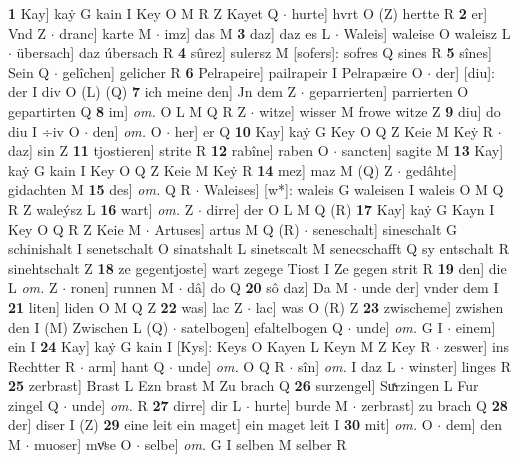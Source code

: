 \documentclass[8pt,a4paper,notitlepage]{article}
\begin{document}
\begin{table}[ht]
\begin{minipage}[t]{0.5\linewidth}
\textbf{1} Kay] kaẏ G kain I Key O M R Z Kayet Q  $\cdot$ hurte] hvrt O (Z) hertte R \textbf{2} er] Vnd Z  $\cdot$ dranc] karte M  $\cdot$ imz] das M \textbf{3} daz] daz es L  $\cdot$ Waleis] waleise O waleisz L  $\cdot$ übersach] daz úbersach R \textbf{4} sûrez] sulersz M [sofers]: sofres Q sines R \textbf{5} sînes] Sein Q  $\cdot$ gelîchen] gelicher R \textbf{6} Pelrapeire] pailrapeir I Pelrapæire O  $\cdot$ der] [diu]: der I div O (L) (Q) \textbf{7} ich meine den] Jn dem Z  $\cdot$ geparrierten] parrierten O gepartirten Q \textbf{8} im] \textit{om.} O L M Q R Z  $\cdot$ witze] wisser M frowe witze Z \textbf{9} diu] do diu I ÷iv O  $\cdot$ den] \textit{om.} O  $\cdot$ her] er Q \textbf{10} Kay] kaẏ G Key O Q Z Keie M Keẏ R  $\cdot$ daz] sin Z \textbf{11} tjostieren] strite R \textbf{12} rabîne] raben O  $\cdot$ sancten] sagite M \textbf{13} Kay] kaẏ G kain I Key O Q Z Keie M Keẏ R \textbf{14} mez] maz M (Q) Z  $\cdot$ gedâhte] gidachten M \textbf{15} des] \textit{om.} Q R  $\cdot$ Waleises] [w*]: waleis G waleisen I waleis O M Q R Z waleýsz L \textbf{16} wart] \textit{om.} Z  $\cdot$ dirre] der O L M Q (R) \textbf{17} Kay] kaẏ G Kayn I Key O Q R Z Keie M  $\cdot$ Artuses] artus M Q (R)  $\cdot$ seneschalt] sineschalt G schinishalt I senetschalt O sinatshalt L sinetscalt M senecschafft Q sy entschalt R sinehtschalt Z \textbf{18} ze gegentjoste] wart zegege Tiost I Ze gegen strit R \textbf{19} den] die L \textit{om.} Z  $\cdot$ ronen] runnen M  $\cdot$ dâ] do Q \textbf{20} sô daz] Da M  $\cdot$ unde der] vnder dem I \textbf{21} liten] liden O M Q Z \textbf{22} was] lac Z  $\cdot$ lac] was O (R) Z \textbf{23} zwischeme] zwishen den I (M) Zwischen L (Q)  $\cdot$ satelbogen] efaltelbogen Q  $\cdot$ unde] \textit{om.} G I  $\cdot$ einem] ein I \textbf{24} Kay] kaẏ G kain I [Kys]: Keys O Kayen L Keyn M Z Key R  $\cdot$ zeswer] ins Rechtter R  $\cdot$ arm] hant Q  $\cdot$ unde] \textit{om.} O Q R  $\cdot$ sîn] \textit{om.} I daz L  $\cdot$ winster] linges R \textbf{25} zerbrast] Brast L Ezn brast M Zu brach Q \textbf{26} surzengel] Suͯrzingen L Fur zingel Q  $\cdot$ unde] \textit{om.} R \textbf{27} dirre] dir L  $\cdot$ hurte] burde M  $\cdot$ zerbrast] zu brach Q \textbf{28} der] diser I (Z) \textbf{29} eine leit ein maget] ein maget leit I \textbf{30} mit] \textit{om.} O  $\cdot$ dem] den M  $\cdot$ muoser] mvͦse O  $\cdot$ selbe] \textit{om.} G I selben M selber R \newline
\end{minipage}
\hspace{0.5cm}
\begin{minipage}[t]{0.5\linewidth}

\end{minipage}
\end{table}
\end{document}
